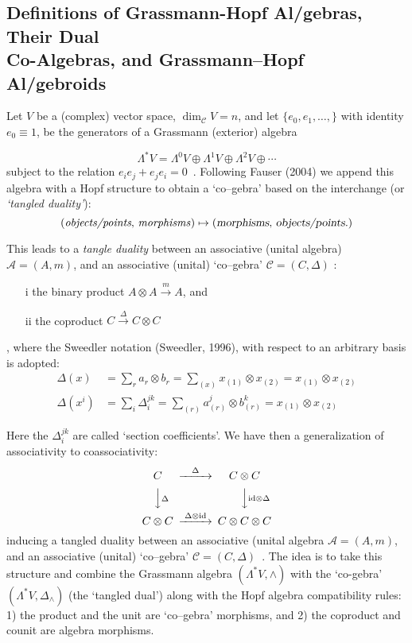 \documentclass[12pt]{article}
\theoremstyle{plain}
\theoremstyle{definition}
\numberwithin{equation}{section}
\newcommand{\ID}{{\rm id}}
\newcommand{\A}{\mathcal A}
\newcommand{\lra}{{\longrightarrow}}
\newcommand{\ovsetl}[1]{\overset {#1}{\lra}}
\newcommand{\<}{{\langle}}
\begin{document}
\subsection{Definitions of Grassmann-Hopf Al/gebras, Their Dual \\
Co-Algebras, and Grassmann--Hopf Al/gebroids}

 Let $V$ be a (complex) vector space, $\dim_{\mathcal C} V = n$, and let $\{e_0, e_1, \ldots, \}$ with identity $e_0 \equiv 1$, be the generators of a Grassmann (exterior) algebra

\begin{equation}
\Lambda^*V = \Lambda^0 V \oplus \Lambda^1 V \oplus \Lambda^2 V
\oplus  \cdots
\end{equation}
subject to the relation $e_i e_j + e_j e_i = 0$~. Following Fauser
(2004) we append this algebra with a Hopf structure to obtain a
`co--gebra' based on the interchange (or \textsl{`tangled duality'}): \\

$$\text{(\textit{objects/points}, \textit{morphisms})} \mapsto \text{(\textsl{morphisms}, \textsl{objects/points.})}$$

 This leads to a \textsl{tangle duality} between an associative (unital algebra) 
$\A=(A,m)$, and an associative (unital) `co--gebra' $\mathcal{C}=(C,\Delta)$ :

\begin{itemize}
\item[i] the binary product $A \otimes A \ovsetl{m} A$, and
\item[ii] the coproduct $C \ovsetl{\Delta} C \otimes C$ \end{itemize}, 
where the Sweedler notation (Sweedler, 1996), with respect to an
arbitrary basis is adopted: $$
\begin{aligned}
\Delta (x) &= \sum_r a_r \otimes b_r = \sum_{(x)} x_{(1)} \otimes
x_{(2)} = x _{(1)} \otimes x_{(2)} \\ \Delta (x^i) &= \sum_i
\Delta^{jk}_i = \sum_{(r)} a^j_{(r)} \otimes b^k_{(r)} = x _{(1)}
\otimes x_{(2)}
\end{aligned}
$$

Here the $\Delta^{jk}_i$ are called `section coefficients'. We have then a generalization of associativity to coassociativity:
\begin{equation}
\begin{CD}
C  @> \Delta >> C \otimes C
\\ @VV \Delta V   @VV \ID \otimes \Delta V  \\ C \otimes C
 @> \Delta \otimes \ID >> C \otimes C \otimes C
\end{CD}
\end{equation}
inducing a tangled duality between an associative (unital algebra
$\mathcal A = (A,m)$, and an associative (unital) `co--gebra'
$\mathcal C = (C, \Delta)$~. The idea is to take this structure
and combine the Grassmann algebra $(\Lambda^*V, \wedge)$ with the
`co-gebra' $(\Lambda^*V, \Delta_{\wedge})$ (the `tangled dual')
along with the Hopf algebra compatibility rules: 1) the product
and the unit are `co--gebra' morphisms, and 2) the coproduct and
counit are algebra morphisms.
\end{document}
